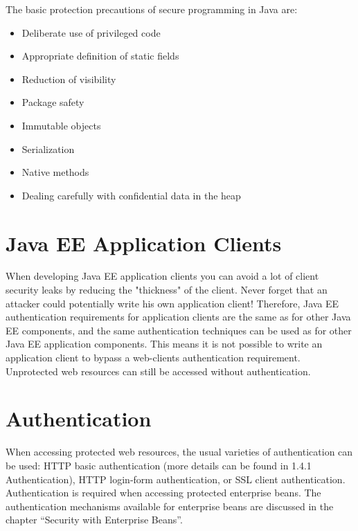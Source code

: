 \documentclass[12pt,a4paper]{report}
\begin{document}
The basic protection precautions of secure programming in Java are:

\begin{itemize}
\item Deliberate use of privileged code
\item Appropriate definition of static fields
\item Reduction of visibility
\item Package safety
\item Immutable objects
\item Serialization
\item Native methods
\item Dealing carefully with confidential data in the heap
\end{itemize}

\section{Java EE Application Clients}
When developing Java EE application clients you can avoid a lot of client security leaks by reducing the "thickness" of the client. Never forget that an attacker could potentially write his own application client! Therefore, Java EE authentication requirements for application clients are the same as for other Java EE components, and the same authentication techniques can be used as for other Java EE application components. This means it is not possible to write an application client to bypass a web-clients authentication requirement. Unprotected web resources can still be accessed without authentication.

\section{Authentication}
When accessing protected web resources, the usual varieties of authentication can be used: HTTP basic authentication (more details can be found in 1.4.1 Authentication), HTTP login-form authentication, or SSL client authentication.
Authentication is required when accessing protected enterprise beans. The authentication mechanisms available for enterprise beans are discussed in the chapter “Security with Enterprise Beans”.
\end{document}
